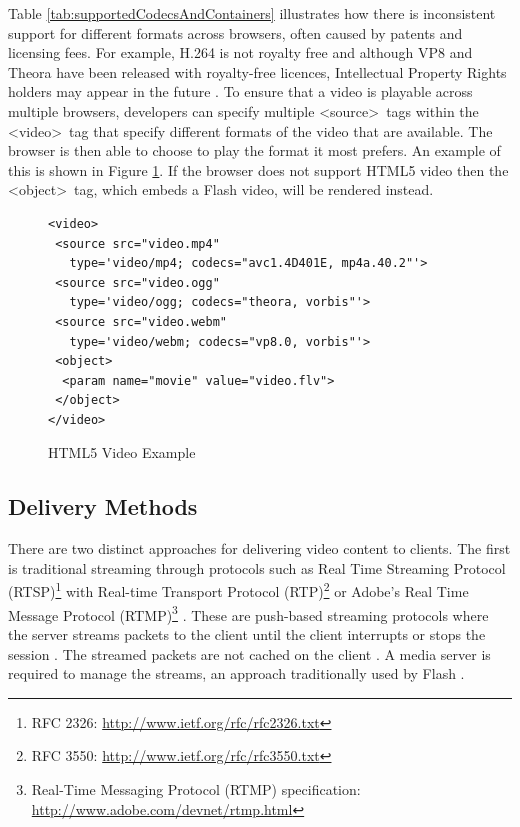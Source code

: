 \documentclass[journal]{IEEEtran}
\begin{document}
Table \ref{tab:supportedCodecsAndContainers} illustrates how there is inconsistent support for different formats across browsers, often caused by patents and licensing fees. For example, H.264 is not royalty free and although VP8 and Theora have been released with royalty-free licences, Intellectual Property Rights holders may appear in the future \cite{article:towardsVideoOnTheWebWithHTML5}\cite{website:theoraBenefits}. To ensure that a video is playable across multiple browsers, developers can specify multiple \textless source\textgreater~tags within the \textless video\textgreater~tag that specify different formats of the video that are available. The browser is then able to choose to play the format it most prefers. An example of this is shown in Figure \ref{lst:HTML5VideoExample}. If the browser does not support HTML5 video then the \textless object\textgreater~tag, which embeds a Flash video, will be rendered instead.

\begin{figure}
\caption{HTML5 Video Example}
\label{lst:HTML5VideoExample}
\begin{lstlisting}[frame=single,language=HTML5,basicstyle=\footnotesize]
<video>
 <source src="video.mp4"
   type='video/mp4; codecs="avc1.4D401E, mp4a.40.2"'>
 <source src="video.ogg"
   type='video/ogg; codecs="theora, vorbis"'>
 <source src="video.webm"
   type='video/webm; codecs="vp8.0, vorbis"'>
 <object>
  <param name="movie" value="video.flv">
 </object>
</video>
\end{lstlisting}
\end{figure}

\subsection{Delivery Methods}
There are two distinct approaches for delivering video content to clients. The first is traditional streaming through protocols such as Real Time Streaming Protocol (RTSP)\footnote{RFC 2326: \url{http://www.ietf.org/rfc/rfc2326.txt}} with Real-time Transport Protocol (RTP)\footnote{RFC 3550: \url{http://www.ietf.org/rfc/rfc3550.txt}} or Adobe's Real Time Message Protocol (RTMP)\footnote{Real-Time Messaging Protocol (RTMP) specification: \url{http://www.adobe.com/devnet/rtmp.html}} \cite{article:areWeInTheMiddleOfAVideoStreamingRevolution}. These are push-based streaming protocols where the server streams packets to the client until the client interrupts or stops the session \cite{article:watchingVideoOverTheWeb}. The streamed packets are not cached on the client \cite{article:watchingVideoOverTheWeb}. A media server is required to manage the streams, an approach traditionally used by Flash \cite{article:flashPlayer}.
\end{document}
